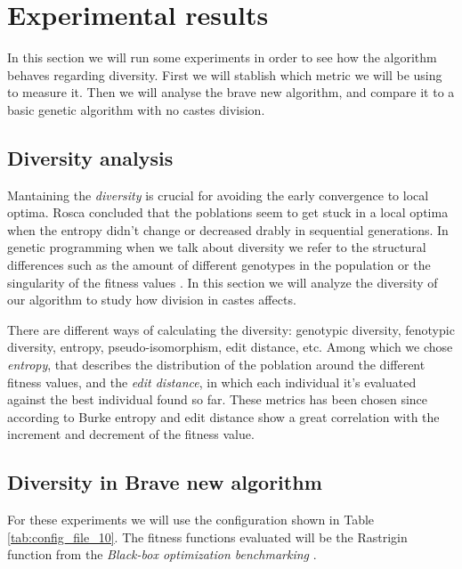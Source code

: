 \section{Experimental results}
\label{sec:experiments}

In this section we will run some experiments in order to see how the algorithm behaves regarding diversity.
First we will stablish which metric we will be using to measure it. Then we will analyse the brave new algorithm, and
compare it to a basic genetic algorithm with no castes division.

\subsection{Diversity analysis}

Mantaining the \emph{diversity} is crucial for avoiding the early convergence to local optima. Rosca \cite{Rosca} concluded that 
the poblations seem to get stuck in a local optima when the entropy didn't change or decreased drably in sequential generations.
In genetic programming when we talk about diversity we refer to the structural differences such as the amount of different
genotypes in the population or the singularity of the fitness values \cite{genetic}. In this section we will analyze the diversity of our
algorithm to study how division in castes affects.

There are different ways of calculating the diversity: genotypic diversity, fenotypic diversity, entropy, pseudo-isomorphism, edit distance, etc.
Among which we chose \textit{entropy}, that describes the distribution of the poblation around the different fitness values, and the \textit{edit distance},
in which each individual it's evaluated against the best individual found so far. These metrics has been chosen since according to Burke \cite{diversity} entropy
and edit distance show a great correlation with the increment and decrement of the fitness value.

\subsection{Diversity in Brave new algorithm}

For these experiments we will use the configuration shown in Table \ref{tab:config_file_10}. The fitness functions evaluated will be the Rastrigin
function from the \emph{Black-box optimization benchmarking} \cite{BBOB}.

